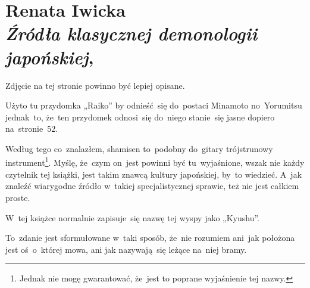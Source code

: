 \documentclass[a4paper,11pt]{article}
\numberwithin{equation}{section}
\begin{document}
\VerSpaceTwo



\section{ %
  Renata Iwicka \\
  \textit{Źródła klasycznej demonologii japońskiej},
  \cite{IwickaZrodlaKlasycznejDemonologiJaponskiej2017}}

\vspace{0em}



\vspace{0em}


 Zdjęcie na tej stronie powinno być lepiej opisane.

\VerSpaceFour





 Użyto tu przydomka „Raiko” %
by odnieść~się do~postaci Minamoto no~Yorumitsu jednak~to, że~ten
przydomek odnosi~się do~niego stanie~się jasne dopiero na~stronie~52.

\VerSpaceFour





 Według tego co~znalazłem, shamisen
to~podobny do~gitary trójstrunowy instrument\footnote{Jednak nie mogę
  gwarantować, że~jest to poprane wyjaśnienie tej nazwy.}. Myślę,
że~czym on~jest powinni być tu~wyjaśnione, wszak nie każdy czytelnik
tej książki, jest takim znawcą kultury japońskiej, by~to wiedzieć.
A~jak znaleźć wiarygodne źródło w~takiej specjalistycznej sprawie, też
nie jest całkiem proste.

\VerSpaceFour





 W~tej książce normalnie zapisuje~się nazwę tej
wyspy jako „Kyushu”. %

\VerSpaceFour





 To~zdanie jest sformułowane w~taki sposób,
że~nie rozumiem ani~jak położona jest oś~o~której mowa, ani jak
nazywają~się leżące na~niej bramy.

\VerSpaceFour
\end{document}
